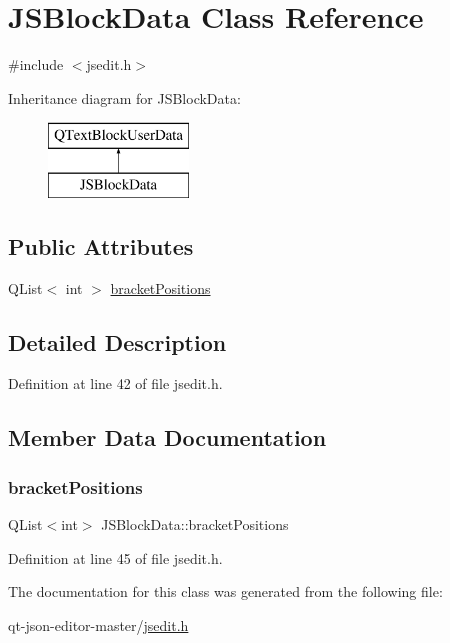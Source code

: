 \hypertarget{class_j_s_block_data}{}\section{J\+S\+Block\+Data Class Reference}
\label{class_j_s_block_data}


{\ttfamily \#include $<$jsedit.\+h$>$}

Inheritance diagram for J\+S\+Block\+Data\+:\begin{figure}[H]
\begin{center}
\leavevmode
\includegraphics[height=2.000000cm]{class_j_s_block_data}
\end{center}
\end{figure}
\subsection*{Public Attributes}
\begin{DoxyCompactItemize}
\item 
Q\+List$<$ int $>$ \hyperlink{class_j_s_block_data_af1084b33f21551858059f78de49485a3}{bracket\+Positions}
\end{DoxyCompactItemize}


\subsection{Detailed Description}


Definition at line 42 of file jsedit.\+h.



\subsection{Member Data Documentation}
\mbox{\label{class_j_s_block_data_af1084b33f21551858059f78de49485a3}} 
\subsubsection{\texorpdfstring{bracket\+Positions}{bracketPositions}}
{\footnotesize\ttfamily Q\+List$<$int$>$ J\+S\+Block\+Data\+::bracket\+Positions}



Definition at line 45 of file jsedit.\+h.



The documentation for this class was generated from the following file\+:\begin{DoxyCompactItemize}
\item 
qt-\/json-\/editor-\/master/\hyperlink{jsedit_8h}{jsedit.\+h}\end{DoxyCompactItemize}
